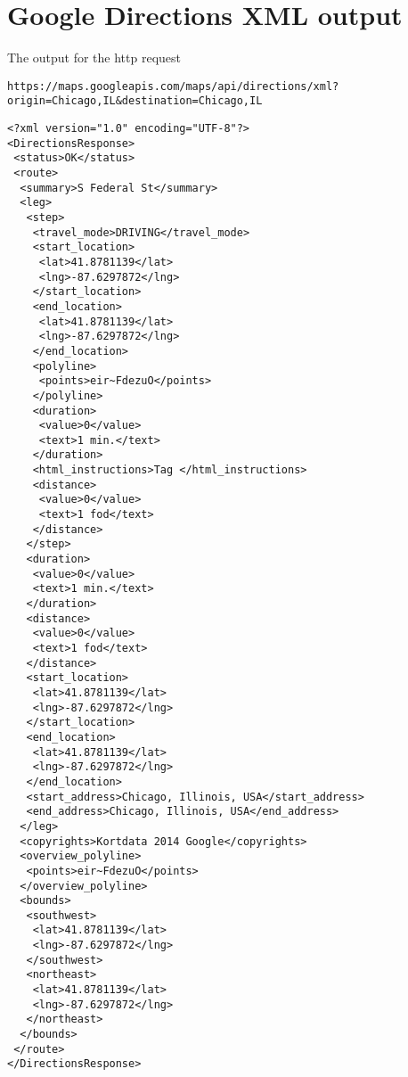 \chapter{Google Directions XML output}\label{gdir}

The output for the http request

\begin{lstlisting}
https://maps.googleapis.com/maps/api/directions/xml?origin=Chicago,IL&destination=Chicago,IL
\end{lstlisting}


\begin{lstlisting}
<?xml version="1.0" encoding="UTF-8"?>
<DirectionsResponse>
 <status>OK</status>
 <route>
  <summary>S Federal St</summary>
  <leg>
   <step>
    <travel_mode>DRIVING</travel_mode>
    <start_location>
     <lat>41.8781139</lat>
     <lng>-87.6297872</lng>
    </start_location>
    <end_location>
     <lat>41.8781139</lat>
     <lng>-87.6297872</lng>
    </end_location>
    <polyline>
     <points>eir~FdezuO</points>
    </polyline>
    <duration>
     <value>0</value>
     <text>1 min.</text>
    </duration>
    <html_instructions>Tag </html_instructions>
    <distance>
     <value>0</value>
     <text>1 fod</text>
    </distance>
   </step>
   <duration>
    <value>0</value>
    <text>1 min.</text>
   </duration>
   <distance>
    <value>0</value>
    <text>1 fod</text>
   </distance>
   <start_location>
    <lat>41.8781139</lat>
    <lng>-87.6297872</lng>
   </start_location>
   <end_location>
    <lat>41.8781139</lat>
    <lng>-87.6297872</lng>
   </end_location>
   <start_address>Chicago, Illinois, USA</start_address>
   <end_address>Chicago, Illinois, USA</end_address>
  </leg>
  <copyrights>Kortdata 2014 Google</copyrights>
  <overview_polyline>
   <points>eir~FdezuO</points>
  </overview_polyline>
  <bounds>
   <southwest>
    <lat>41.8781139</lat>
    <lng>-87.6297872</lng>
   </southwest>
   <northeast>
    <lat>41.8781139</lat>
    <lng>-87.6297872</lng>
   </northeast>
  </bounds>
 </route>
</DirectionsResponse>

\end{lstlisting}